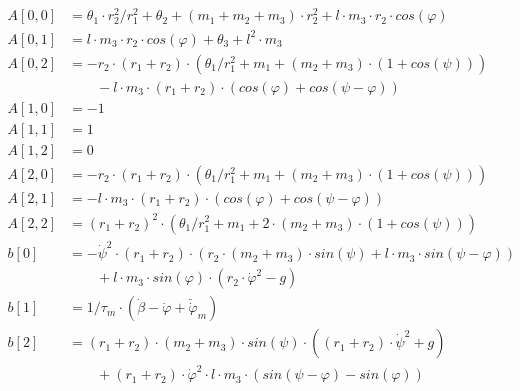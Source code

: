 \documentclass{article}
\begin{document}
\begin{align*}
A[0,0] &= \theta_1 \cdot r_2^2/r_1^2 + \theta_2 + (m_1 + m_2 + m_3) \cdot r_2^2 + l \cdot m_3 \cdot r_2 \cdot cos(\varphi)\\
A[0,1] &= l \cdot m_3 \cdot r_2 \cdot cos(\varphi) + \theta_3 + l^2 \cdot m_3 \\
A[0,2] &= -r_2 \cdot (r_1 + r_2) \cdot (\theta_1/r_1^2  + m_1 + (m_2+m_3) \cdot (1+cos(\psi))) \\
&\qquad -l \cdot m_3 \cdot (r_1 + r_2) \cdot (cos(\varphi) + cos(\psi - \varphi)) \\
A[1,0] &= -1 \\
A[1,1] &= 1 \\
A[1,2] &= 0 \\
A[2,0] &= -r_2 \cdot (r_1 + r_2) \cdot (\theta_1/r_1^2  + m_1 + (m_2+m_3) \cdot (1+cos(\psi))) \\
A[2,1] &= -l \cdot m_3 \cdot (r_1 + r_2) \cdot (cos(\varphi) + cos(\psi - \varphi)) \\
A[2,2] &= (r_1 + r_2)^2 \cdot (\theta_1/r_1^2 + m_1 + 2 \cdot (m_2+m_3) \cdot (1+cos(\psi))) \\
b[0] &= - \dot{\psi}^2 \cdot (r_1 + r_2) \cdot ( r_2 \cdot (m_2+m_3) \cdot sin(\psi) +  l \cdot m_3 \cdot sin(\psi - \varphi)) \\
&\qquad  + l \cdot m_3 \cdot sin(\varphi) \cdot (r_2 \cdot  \dot{\varphi}^2 - g) \\
b[1] &= 1/\tau_m \cdot (\dot{\beta} - \dot{\varphi} + \breve{\dot{\varphi}}_m) \\
b[2] &= (r_1 + r_2) \cdot (m_2+m_3) \cdot sin(\psi) \cdot ((r_1 + r_2) \cdot \dot{\psi}^2 + g) \\
&\qquad +(r_1 + r_2) \cdot \dot{\varphi}^2 \cdot l \cdot m_3 \cdot (sin(\psi - \varphi)-sin(\varphi)) \\
\end{align*}
\end{document}
